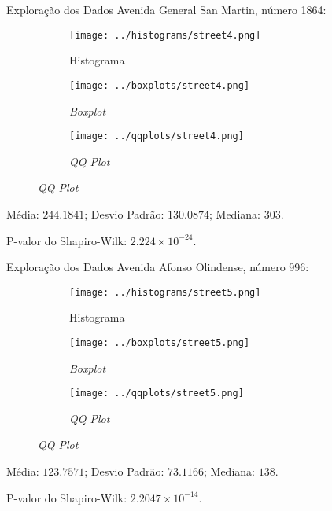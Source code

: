 \begin{frame}{Exploração dos Dados}
Avenida General San Martin, número 1864:
\vskip 0.05cm
\begin{figure}
	\centering
	\begin{subfigure}{.33\textwidth}
		\centering
		\texttt{[image: ../histograms/street4.png]}
		\caption*{Histograma}
	\end{subfigure}%
	\begin{subfigure}{.33\textwidth}
		\centering
		\texttt{[image: ../boxplots/street4.png]}
		\caption*{\textit{Boxplot}}
	\end{subfigure}
	\begin{subfigure}{.32\textwidth}
		\centering
		\texttt{[image: ../qqplots/street4.png]}
		\caption*{\textit{QQ Plot}}
	\end{subfigure}
\end{figure}
\vskip 0.05cm
Média: $244.1841$; Desvio Padrão: $130.0874$; Mediana: $303$.

P-valor do Shapiro-Wilk: $2.224 \times 10^{-24}$.
\end{frame}

\begin{frame}{Exploração dos Dados}
Avenida Afonso Olindense, número 996:
\vskip 0.05cm
\begin{figure}
	\centering
	\begin{subfigure}{.33\textwidth}
		\centering
		\texttt{[image: ../histograms/street5.png]}
		\caption*{Histograma}
	\end{subfigure}%
	\begin{subfigure}{.33\textwidth}
		\centering
		\texttt{[image: ../boxplots/street5.png]}
		\caption*{\textit{Boxplot}}
	\end{subfigure}
	\begin{subfigure}{.32\textwidth}
		\centering
		\texttt{[image: ../qqplots/street5.png]}
		\caption*{\textit{QQ Plot}}
	\end{subfigure}
\end{figure}
\vskip 0.05cm
Média: $123.7571$; Desvio Padrão: $73.1166$; Mediana: $138$.

P-valor do Shapiro-Wilk: $2.2047 \times 10^{-14}$.
\end{frame}

